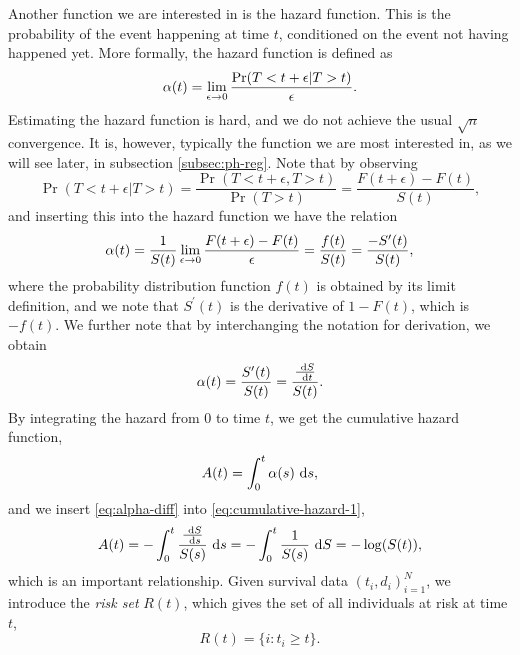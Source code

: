 Another function we are interested in is the hazard function.
This is the probability of the event happening at time $t$, conditioned on the event not having happened yet.
More formally, the hazard function is defined as
\begin{equation*}
    \alpha(t)=\lim_{\epsilon\to0}\frac{\Pr(T<t+\epsilon|T>t)}{\epsilon}.
\end{equation*}
Estimating the hazard function is hard, and we do not achieve the usual $\sqrt{n}$ convergence.
It is, however, typically the function we are most interested in, as we will see later, in subsection \ref{subsec:ph-reg}.
Note that by observing
\begin{equation*}
    \Pr(T<t+\epsilon|T>t)=\frac{\Pr(T<t+\epsilon,T>t)}{\Pr(T>t)}=\frac{F(t+\epsilon)-F(t)}{S(t)},
\end{equation*}
and inserting this into the hazard function we have the relation
\begin{equation}
\label{eq:hfs}
    \alpha(t)=\frac{1}{S(t)}\lim_{\epsilon\to0}\frac{F(t+\epsilon)-F(t)}{\epsilon}=\frac{f(t)}{S(t)}=\frac{-S^\prime(t)}{S(t)},
\end{equation}
where the probability distribution function $f(t)$ is obtained by its limit definition, and we note that $S^\prime(t)$ is the derivative of $1-F(t)$, which is $-f(t)$.
We further note that by interchanging the notation for derivation, we obtain
\begin{equation}\label{eq:alpha-diff}
\alpha(t)=\frac{S^{\prime}(t)}{S(t)}=\frac{\frac{~\text{d} S}{~\text{d} t}}{S(t)}.
\end{equation}
By integrating the hazard from 0 to time $t$, we get the cumulative hazard function,
\begin{equation}\label{eq:cumulative-hazard-1}
    A(t)=\int_0^t\alpha(s)~\text{d} s,
\end{equation}
and we insert \eqref{eq:alpha-diff} into \eqref{eq:cumulative-hazard-1},
\begin{equation}\label{eq:cumulative-hazard}
\begin{split}
     A(t)=-\int_0^t\frac{\frac{~\text{d} S}{~\text{d} s}}{S(s)}~\text{d} s=-\int_0^t\frac{1}{S(s)}~\text{d} S=-\log(S(t)),
\end{split}
\end{equation}
which is an important relationship.
Given survival data $(t_i,d_i)_{i=1}^N$, we introduce the \textit{risk set} $R(t)$, which gives the set of all individuals at risk at time $t$,
\begin{equation*}
    R(t)=\{i\colon t_i\geq t\}.
\end{equation*}
